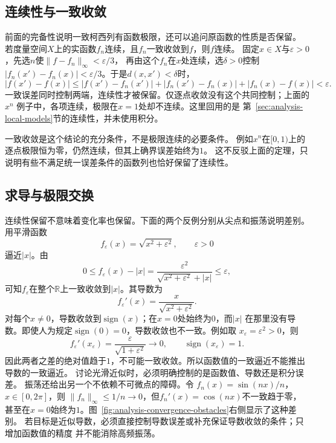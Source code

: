 \subsection{连续性与一致收敛}
前面的完备性说明一致柯西列有函数极限，还可以追问原函数的性质是否保留。
若度量空间$X$上的实函数$f_n$连续，且$f_n$一致收敛到$f$，则$f$连续。
固定$x\in X$与$\varepsilon>0$，先选$n$使$\lVert f-f_n\rVert_\infty<\varepsilon/3$，
再由这个$f_n$在$x$处连续，选$\delta>0$控制
$|f_n(x')-f_n(x)|<\varepsilon/3$。于是$d(x,x')<\delta$时，
\[
 |f(x')-f(x)|
 \leq |f(x')-f_n(x')|+|f_n(x')-f_n(x)|+|f_n(x)-f(x)|
 <\varepsilon.
\]
一致误差同时控制两端，连续性才被保留。仅逐点收敛没有这个共同控制；上面的$x^n$
例子中，各项连续，极限在$x=1$处却不连续。这里回用的是
第~\ref{sec:analysis-local-models}节的连续性，并未使用积分。

一致收敛是这个结论的充分条件，不是极限连续的必要条件。
例如$x^n$在$[0,1)$上的逐点极限恒为零，仍然连续，但其上确界误差始终为$1$。
这不反驳上面的定理，只说明有些不满足统一误差条件的函数列也恰好保留了连续性。

\subsection{求导与极限交换}

连续性保留不意味着变化率也保留。下面的两个反例分别从尖点和振荡说明差别。
用平滑函数
\[   f_{\varepsilon}(x)=\sqrt{x^2+\varepsilon^2},   \qquad \varepsilon>0 \]
逼近$|x|$。由
\[   0\leq f_{\varepsilon}(x)-|x|   =   \frac{\varepsilon^2}   {\sqrt{x^2+\varepsilon^2}+|x|}   \leq\varepsilon, \]
可知$f_{\varepsilon}$在整个$\mathbb{R}$上一致收敛到$|x|$。其导数为
\[   f_{\varepsilon}'(x)   =   \frac{x}{\sqrt{x^2+\varepsilon^2}}. \]
对每个$x\neq0$，导数收敛到$\operatorname{sign}(x)$；在$x=0$处始终为$0$，而$|x|$
在那里没有导数。即使人为规定$\operatorname{sign}(0)=0$，导数收敛也不一致。例如取
$x_\varepsilon=\varepsilon^2>0$，则
\[
  f_\varepsilon'(x_\varepsilon)
  =
  \frac{\varepsilon}{\sqrt{1+\varepsilon^2}}
  \longrightarrow0,
  \qquad
  \operatorname{sign}(x_\varepsilon)=1.
\]
因此两者之差的绝对值趋于$1$，不可能一致收敛。所以函数值的一致逼近不能推出导数的一致逼近。
讨论光滑近似时，必须明确控制的是函数值、导数还是积分误差。
振荡还给出另一个不依赖不可微点的障碍。令
$f_n(x)=\sin(nx)/n$，$x\in[0,2\pi]$，则
$\lVert f_n\rVert_\infty\leq1/n\to0$，但$f_n'(x)=\cos(nx)$不一致趋于零，
甚至在$x=0$始终为$1$。图~\ref{fig:analysis-convergence-obstacles}右侧显示了这种差别。
若目标是近似导数，必须直接控制导数误差或补充保证导数收敛的条件；只增加函数值的精度
并不能消除高频振荡。

